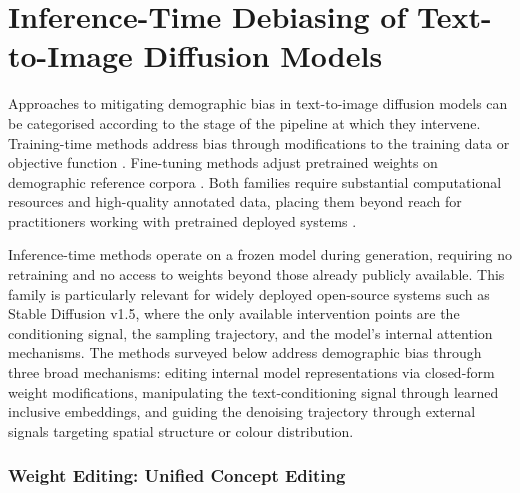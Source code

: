 \newpage
\section{Inference-Time Debiasing of Text-to-Image Diffusion Models}
\label{sec:inference_debiasing}

Approaches to mitigating demographic bias in text-to-image diffusion models can be categorised according to the stage of the pipeline at which they intervene. Training-time methods address bias through modifications to the training data or objective function \cite{Yang_2020_FairerDatasets, Zhang_2018_MitigatingUnwantedBiasesAdversarial}. Fine-tuning methods adjust pretrained weights on demographic reference corpora \cite{Friedrich_2023_FairDiffusionInstructingTextToImage}. Both families require substantial computational resources and high-quality annotated data, placing them beyond reach for practitioners working with pretrained deployed systems \cite{Jiang_2025_FairGen}.

Inference-time methods operate on a frozen model during generation, requiring no retraining and no access to weights beyond those already publicly available. This family is particularly relevant for widely deployed open-source systems such as Stable Diffusion v1.5, where the only available intervention points are the conditioning signal, the sampling trajectory, and the model's internal attention mechanisms. The methods surveyed below address demographic bias through three broad mechanisms: editing internal model representations via closed-form weight modifications, manipulating the text-conditioning signal through learned inclusive embeddings, and guiding the denoising trajectory through external signals targeting spatial structure or colour distribution.

\subsubsection*{Weight Editing: Unified Concept Editing}
\label{subsubsec:uce}

